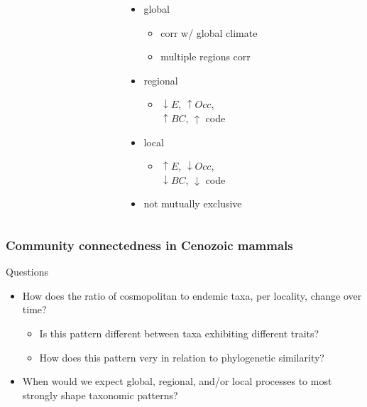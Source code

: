 \documentclass{beamer}
\begin{document}
\begin{frame}
\begin{columns}
\begin{column}{0.55\textwidth}
      \tiny{}
    \end{column}
    \begin{column}{0.45\textwidth}
      \begin{itemize}
        \item global
          \begin{itemize}
            \item corr w/ global climate
            \item multiple regions corr
          \end{itemize}
        \item regional
          \begin{itemize}
            \item \(\downarrow E\), \(\uparrow Occ\), \\\(\uparrow BC\), \(\uparrow\) code
          \end{itemize}
        \item local
          \begin{itemize}
            \item \(\uparrow E\), \(\downarrow Occ\), \\\(\downarrow BC\), \(\downarrow\) code
          \end{itemize}
        \item \alert{not mutually exclusive}
      \end{itemize}
    \end{column}
  \end{columns}
\end{frame}

\begin{frame}
  \frametitle{Community connectedness in Cenozoic mammals}

  \begin{block}{Questions}
    \begin{itemize}
      \item How does the ratio of cosmopolitan to endemic taxa, per locality, change over time? 
        \begin{itemize}
          \item Is this pattern different between taxa exhibiting different traits? 
          \item How does this pattern very in relation to phylogenetic similarity? 
        \end{itemize}
      \item When would we expect global, regional, and/or local processes to most strongly shape taxonomic patterns?
    \end{itemize}
  \end{block}
\end{frame}
\end{document}
